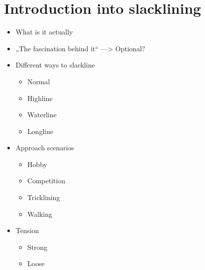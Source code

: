 \section{Introduction into slacklining}\label{3_1_introductionSlacklining}
\begin{itemize}
\item What is it actually
\item „The fascination behind it“ —> Optional?
\item Different ways to slackline \textbf{ }

\begin{itemize}
\item Normal
\item Highline
\item Waterline
\item Longline
\end{itemize}

\item Approach scenarios
\begin{itemize}
\item Hobby
\item Competition
\item Tricklining
\item Walking
\end{itemize}

\item Tension
\begin{itemize}
\item Strong
\item Loose
\end{itemize}

\end{itemize}